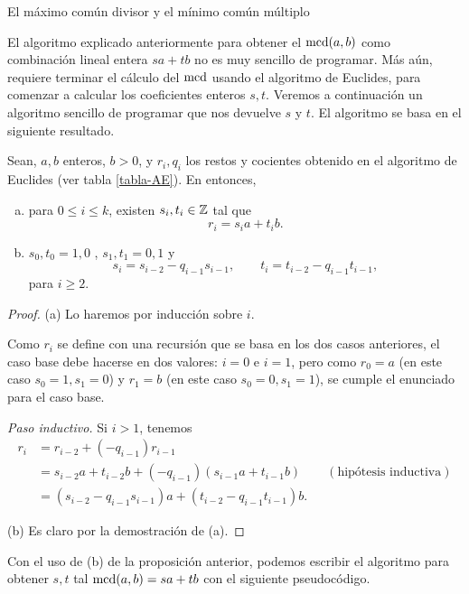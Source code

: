 \begin{section}{El máximo común divisor y el mínimo común
múltiplo}
\begin{observacion}[*]
El  algoritmo explicado anteriormente para obtener el $\operatorname{mcd}(a,b)$ como combinación lineal entera $sa+tb$ no es muy sencillo de programar. Más aún, requiere terminar el cálculo del $\operatorname{mcd}$ usando el algoritmo de Euclides, para comenzar a calcular los coeficientes enteros $s,t$. Veremos a continuación un algoritmo sencillo de programar que nos devuelve $s$ y $t$. El algoritmo se basa en el siguiente resultado. 

\begin{proposicion}\label{prop-alg-euclides-2} Sean, $a,b$ enteros, $b>0$, y $r_i, q_i$ los restos y cocientes obtenido en el algoritmo de Euclides (ver tabla \ref{tabla-AE}). En entonces, 
\begin{enumerate}[a)]
	\item 	para $0 \le i \le k$,  existen $s_i, t_i \in {\mathbb Z}$ tal que
	\begin{equation*}
	r_i = s_ia + t_ib.
	\end{equation*}
	\item $s_0, t_0 = 1, 0$ , $s_1, t_1 = 0, 1$ y 
	\begin{equation}
	s_{i} = s_{i-2} - q_{i-1}  s_{i-1}, \qquad t_{i} = t_{i-2} - q_{i-1}  t_{i-1},
	\end{equation}
	para $i \ge 2$.
\end{enumerate}
\end{proposicion}
\begin{proof}
	(a) Lo haremos por inducción sobre $i$.
	
	Como $r_i$ se define con una recursión que se basa en los dos casos anteriores, el caso base debe hacerse en dos valores: $i=0$ e $i=1$, pero como  $r_0 = a$ (en este caso $s_0=1, s_1 =0$) y $r_1 =b$ (en este caso $s_0=0, s_1 =1$), se cumple el enunciado para el caso base. 
	
	\textit{Paso inductivo. } Si $i>1$, tenemos
	\begin{align*}
		r_i &= r_{i-2} + (-q_{i-1})r_{i-1}   \\
			 &= s_{i-2}a + t_{i-2}b +(-q_{i-1})(s_{i-1}a + t_{i-1}b)\qquad (\text{hipótesis inductiva}) \\
			 &= (s_{i-2}-q_{i-1}s_{i-1})a + (t_{i-2}-q_{i-1}t_{i-1}) b.   
	\end{align*}
	
	(b) Es claro por la demostración de (a). 
\end{proof}

Con el uso de (b) de la proposición anterior, podemos escribir el algoritmo para obtener $s,t$ tal $\operatorname{mcd}(a,b) = sa+tb$ con el siguiente pseudocódigo. 


\end{observacion}
\end{section}
